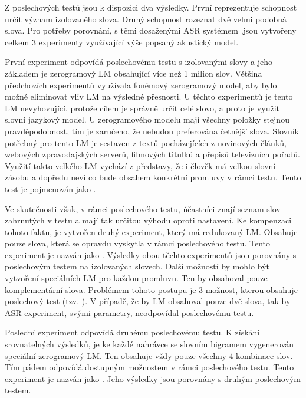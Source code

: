 Z poslechových testů jsou k dispozici dva výsledky. První reprezentuje schopnost určit význam izolovaného slova. Druhý schopnost rozeznat dvě velmi podobná slova. Pro potřeby porovnání, s těmi dosaženými ASR systémem ,jsou vytvořeny celkem $3$ experimenty využívající výše popsaný akustický model.

První experiment odpovídá poslechovému testu s izolovanými slovy a jeho základem je zerogramový LM obsahující více než 1 milion slov. Většina předchozích experimentů využívala fonémový zerogramový model, aby bylo možné eliminovat vliv LM na výsledné přesnosti. U těchto experimentů je tento LM nevyhovující, protože cílem je správně určit celé slovo, a proto je využit slovní jazykový model. U zerogramového modelu mají všechny položky stejnou pravděpodobnost, tím je zaručeno, že nebudou preferována četnější slova. Slovník potřebný pro tento LM je sestaven z textů pocházejících z novinových článků, webových zpravodajských serverů, filmových titulků a přepisů televizních pořadů. Využití takto velkého LM vychází z představy, že i člověk má velkou slovní zásobu a dopředu neví co bude obsahem konkrétní promluvy v rámci testu. Tento test je pojmenován jako .

Ve skutečnosti však, v rámci poslechového testu, účastníci znají seznam slov zahrnutých v testu a mají tak určitou výhodu oproti  nastavení. Ke kompenzaci tohoto faktu, je vytvořen druhý experiment, který má redukovaný LM. Obsahuje pouze slova, která se opravdu vyskytla v rámci poslechového testu. Tento experiment je nazván jako . Výsledky obou těchto experimentů jsou porovnány s poslechovým testem na izolovaných slovech. Další možností by mohlo být vytvoření speciálních LM pro každou promluvu. Ten by obsahoval pouze komplementární slova. Problémem tohoto postupu je 3 možnost, kterou obsahuje poslechový test (tzv. ). V případě, že by LM obsahoval pouze dvě slova, tak by ASR experiment, svými parametry, neodpovídal poslechovému testu.

Poslední experiment odpovídá druhému poslechovému testu. K získání srovnatelných výsledků, je ke každé nahrávce se slovním bigramem vygenerován speciální zerogramový LM. Ten obsahuje vždy pouze všechny 4 kombinace slov. Tím pádem odpovídá dostupným možnostem v rámci poslechového testu. Tento experiment je nazván jako . Jeho výsledky jsou porovnány s druhým poslechovým testem.

